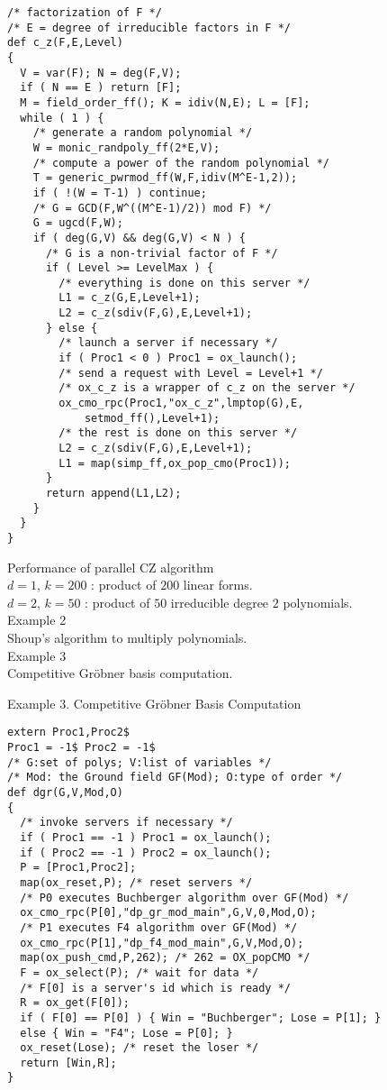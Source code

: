 \documentclass{slides}
\begin{document}
\begin{verbatim}
/* factorization of F */
/* E = degree of irreducible factors in F */
def c_z(F,E,Level)
{
  V = var(F); N = deg(F,V);
  if ( N == E ) return [F];
  M = field_order_ff(); K = idiv(N,E); L = [F];
  while ( 1 ) {
    /* generate a random polynomial */
    W = monic_randpoly_ff(2*E,V);
    /* compute a power of the random polynomial */
    T = generic_pwrmod_ff(W,F,idiv(M^E-1,2));
    if ( !(W = T-1) ) continue;
    /* G = GCD(F,W^((M^E-1)/2)) mod F) */
    G = ugcd(F,W);
    if ( deg(G,V) && deg(G,V) < N ) {
      /* G is a non-trivial factor of F */
      if ( Level >= LevelMax ) {
        /* everything is done on this server */
        L1 = c_z(G,E,Level+1);
        L2 = c_z(sdiv(F,G),E,Level+1);
      } else {
        /* launch a server if necessary */
        if ( Proc1 < 0 ) Proc1 = ox_launch();
        /* send a request with Level = Level+1 */
        /* ox_c_z is a wrapper of c_z on the server */
        ox_cmo_rpc(Proc1,"ox_c_z",lmptop(G),E,
            setmod_ff(),Level+1);
        /* the rest is done on this server */
        L2 = c_z(sdiv(F,G),E,Level+1);
        L1 = map(simp_ff,ox_pop_cmo(Proc1));
      }
      return append(L1,L2);
    }
  }
}
\end{verbatim}
\newpage

\epsfxsize=17cm

\noindent
{\color{blue} Performance of parallel CZ algorithm} \\
$d=1$, $k=200$ : product of $200$ linear forms. \\
$d=2$, $k=50$ : product of $50$ irreducible degree $2$ polynomials. \\

\newpage
{\color{green} Example 2} \\
Shoup's algorithm to multiply polynomials.  \\
{\color{green} Example 3} \\
Competitive Gr\"obner basis computation. \\
\newpage

\noindent
{\color{green} Example 3. Competitive Gr\"obner Basis Computation}
\begin{verbatim}
extern Proc1,Proc2$
Proc1 = -1$ Proc2 = -1$
/* G:set of polys; V:list of variables */
/* Mod: the Ground field GF(Mod); O:type of order */
def dgr(G,V,Mod,O)
{
  /* invoke servers if necessary */
  if ( Proc1 == -1 ) Proc1 = ox_launch();
  if ( Proc2 == -1 ) Proc2 = ox_launch();
  P = [Proc1,Proc2];
  map(ox_reset,P); /* reset servers */
  /* P0 executes Buchberger algorithm over GF(Mod) */
  ox_cmo_rpc(P[0],"dp_gr_mod_main",G,V,0,Mod,O);
  /* P1 executes F4 algorithm over GF(Mod) */
  ox_cmo_rpc(P[1],"dp_f4_mod_main",G,V,Mod,O);
  map(ox_push_cmd,P,262); /* 262 = OX_popCMO */
  F = ox_select(P); /* wait for data */
  /* F[0] is a server's id which is ready */
  R = ox_get(F[0]);
  if ( F[0] == P[0] ) { Win = "Buchberger"; Lose = P[1]; }
  else { Win = "F4"; Lose = P[0]; }
  ox_reset(Lose); /* reset the loser */
  return [Win,R];
}
\end{verbatim}
\newpage
\end{document}
